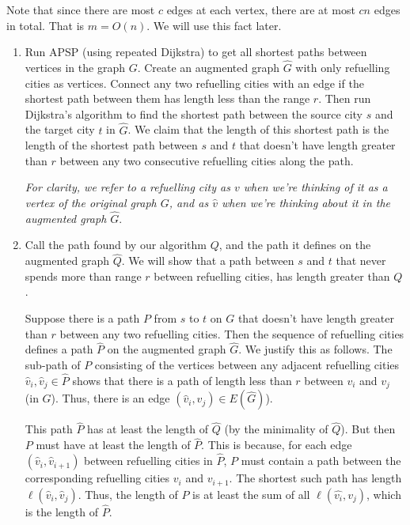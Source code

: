 \documentclass[12 pt, letterpaper]{hmcpset}
\begin{document}
\begin{solution}
	Note that since there are most $c$ edges at each vertex, there are at most $cn$ edges in total. That is $m = O(n)$. We will use this fact later.
	\begin{enumerate}
		\item Run APSP (using repeated Dijkstra) to get all shortest paths between vertices in the graph $G$. Create an augmented graph $\hat{G}$ with only refuelling cities as vertices. Connect any two refuelling cities with an edge if the shortest path between them has length less than the range $r$. Then run Dijkstra's algorithm to find the shortest path between the source city $s$ and the target city $t$ in $\hat{G}$. We claim that the length of this shortest path is the length of the shortest path between $s$ and $t$ that doesn't have length greater than $r$ between any two consecutive refuelling cities along the path.

			\emph{For clarity, we refer to a refuelling city as $v$ when we're thinking of it as a vertex of the original graph $G$, and as $\hat{v}$ when we're thinking about it in the augmented graph $\hat{G}$}.

		\item Call the path found by our algorithm $Q$, and the path it defines on the augmented graph $\hat{Q}$. We will show that a path between $s$ and $t$ that never spends more than range $r$ between refuelling cities, has length greater than $Q$.

			Suppose there is a path $P$ from $s$ to $t$ on $G$ that doesn't have length greater than $r$ between any two refuelling cities. Then the sequence of refuelling cities defines a path $\hat{P}$ on the augmented graph $\hat{G}$. We justify this as follows. The sub-path of $P$ consisting of the vertices between any adjacent refuelling cities $\hat{v}_{i}, \hat{v}_{j} \in \hat{P}$ shows that there is a path of length less than $r$ between $v_{i}$ and $v_{j}$ (in $G$). Thus, there is an edge $(\hat{v}_{i}, \hat{v}_{j}) \in E(\hat{G})$).

			This path $\hat{P}$ has at least the length of $\hat{Q}$ (by the minimality of $\hat{Q}$). But then $P$ must have at least the length of $\hat{P}$. This is because, for each edge $(\hat{v}_{i}, \hat{v}_{i + 1})$ between refuelling cities in $\hat{P}$, $P$ must contain a path between the corresponding refuelling cities $v_{i}$ and $v_{i + 1}$. The shortest such path has length $\ell(\hat{v}_{i}, \hat{v}_{j})$. Thus, the length of $P$ is at least the sum of all  $\ell(\hat{v_{i}}, v_{j})$, which is the length of $\hat{P}$.


\end{enumerate}
\end{solution}
\end{document}
